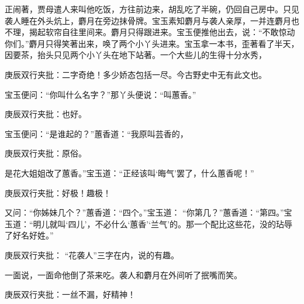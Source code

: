 \begin{parag}
    正闹著，贾母遣人来叫他吃饭，方往前边来，胡乱吃了半碗，仍回自己房中。只见袭人睡在外头炕上，麝月在旁边抹骨牌。宝玉素知麝月与袭人亲厚，一并连麝月也不理，揭起软帘自往里间来。麝月只得跟进来。宝玉便推他出去，说：“不敢惊动你们。”麝月只得笑著出来，唤了两个小丫头进来。宝玉拿一本书，歪著看了半天，因要茶，抬头只见两个小丫头在地下站著。一个大些儿的生得十分水秀，\begin{note}庚辰双行夹批：二字奇绝！多少娇态包括一尽。今古野史中无有此文也。\end{note}宝玉便问：“你叫什么名字？”那丫头便说：“叫蕙香。”\begin{note}庚辰双行夹批：也好。\end{note}宝玉便问：“是谁起的？”蕙香道：“我原叫芸香的，\begin{note}庚辰双行夹批：原俗。\end{note}是花大姐姐改了蕙香。”宝玉道：“正经该叫‘晦气’罢了，什么蕙香呢！”\begin{note}庚辰双行夹批：好极！趣极！\end{note}又问：“你姊妹几个？”蕙香道：“四个。”宝玉道： “你第几？”蕙香道：“第四。”宝玉道：“明儿就叫‘四儿’，不必什么‘蕙香’‘兰气’的。那一个配比这些花，没的玷辱了好名好姓。”\begin{note}庚辰双行夹批： “花袭人”三字在内，说的有趣。\end{note}一面说，一面命他倒了茶来吃。袭人和麝月在外间听了抿嘴而笑。\begin{note}庚辰双行夹批：一丝不漏，好精神！\end{note}
\end{parag}


